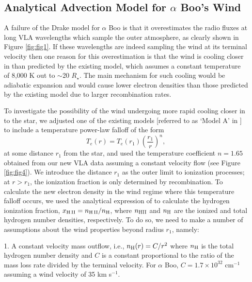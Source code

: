 \documentclass[iop]{emulateapj}
\begin{document}
\subsection{Analytical Advection Model for $\alpha$ Boo's Wind} \label{disc:disc4}

A failure of the Drake model for $\alpha$ Boo is that it overestimates the radio fluxes at long VLA wavelengths which sample the outer atmosphere, as clearly shown in Figure \ref{fig:fig1}. If these wavelengths are indeed sampling the wind at its terminal velocity then one reason for this overestimation is that the wind is cooling closer in than predicted by the existing model, which assumes a constant temperature of 8,000 K out to $\sim$20 $R_{\star}$. The main mechanism for such cooling would be adiabatic expansion \citep{2011ASPC..448..691O} and would cause lower electron densities than those predicted by the existing model due to larger recombination rates. 

To investigate the possibility of the wind undergoing more rapid cooling closer in to the star, we adjusted one of the existing models [referred to as `Model A' in \cite{1985pssl.proc..351D}] to include a temperature power-law falloff of the form
\begin{equation}
T_{e}(r)= T_{e}(r_{1})\left(\frac{r_{1}}{r}\right)^{n},
\label{eq:eq2}
\end{equation}
at some distance $r_{1}$ from the star, and used the temperature coefficient $n=1.65$ obtained from our new VLA data assuming a constant velocity flow (see Figure \ref{fig:fig4}). We introduce the distance $r_{1}$ as the outer limit to ionization processes; at $r > r_{1}$, the ionization fraction is only determined by recombination. To calculate the new electron density in the wind regime where this temperature falloff occurs, we used the analytical expression of \cite{1986ApJ...306..605G} to calculate the hydrogen ionization fraction, $x_{\rm{H \, II}}=n_{\rm{H \, II}}/n_{\rm{H}}$, where $n_{\rm{HII}}$ and $n_{\rm{H}}$ are the ionized and total hydrogen number densities, respectively. To do so, we need to make a number of assumptions about the wind properties beyond radius $r_{1}$, namely:

1. A constant velocity mass outflow, i.e., $n_{\rm{H}}(r)=C/r^2$ where $n_{\rm{H}}$ is the total hydrogen number density and $C$ is a constant proportional to the ratio of the mass loss rate divided by the terminal velocity. For $\alpha$ Boo, $C = 1.7 \times 10^{32} $ cm$^{-1}$ assuming a wind velocity of 35 km s$^{-1}$.
\end{document}
